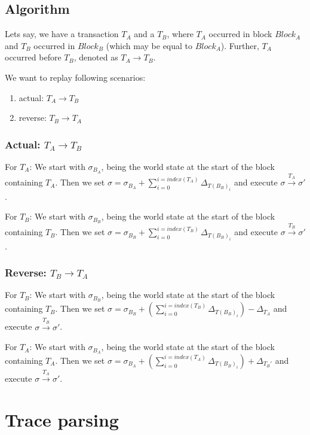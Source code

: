 \documentclass[draft,final]{vutinfth} %
\begin{document}
\subsection{Algorithm}

Lets say, we have a transaction $T_A$ and a $T_B$, where $T_A$ occurred in block $Block_A$ and $T_B$ occurred in $Block_B$ (which may be equal to $Block_A$). Further, $T_A$ occurred before $T_B$, denoted as $T_A \rightarrow T_B$.

We want to replay following scenarios:

\begin{enumerate}
    \item actual: $T_A \rightarrow T_B$
    \item reverse: $T_B \rightarrow T_A$
\end{enumerate}

\subsubsection{Actual: $T_A \rightarrow T_B$}

For $T_A$: We start with $\sigma_{B_A}$, being the world state at the start of the block containing $T_A$. Then we set $\sigma = \sigma_{B_A} + \sum_{i=0}^{i=index(T_A)}\Delta_{T(B_B)_i}$ and execute $\sigma \xrightarrow{T_A} \sigma\prime$.

For $T_B$: We start with $\sigma_{B_B}$, being the world state at the start of the block containing $T_B$. Then we set $\sigma = \sigma_{B_B} + \sum_{i=0}^{i=index(T_B)}\Delta_{T(B_B)_i}$ and execute $\sigma \xrightarrow{T_B} \sigma\prime$.

\subsubsection{Reverse: $T_B \rightarrow T_A$}


For $T_B$: We start with $\sigma_{B_B}$, being the world state at the start of the block containing $T_B$. Then we set $\sigma = \sigma_{B_B} + (\sum_{i=0}^{i=index(T_B)}\Delta_{T(B_B)_i}) - \Delta_{T_A}$ and execute $\sigma \xrightarrow{T_B} \sigma\prime$.

For $T_A$: We start with $\sigma_{B_A}$, being the world state at the start of the block containing $T_A$. Then we set $\sigma = \sigma_{B_A} + (\sum_{i=0}^{i=index(T_A)}\Delta_{T(B_B)_i}) + \Delta_{T_B\prime}$ and execute $\sigma \xrightarrow{T_A} \sigma\prime$.

\section{Trace parsing}
\end{document}
